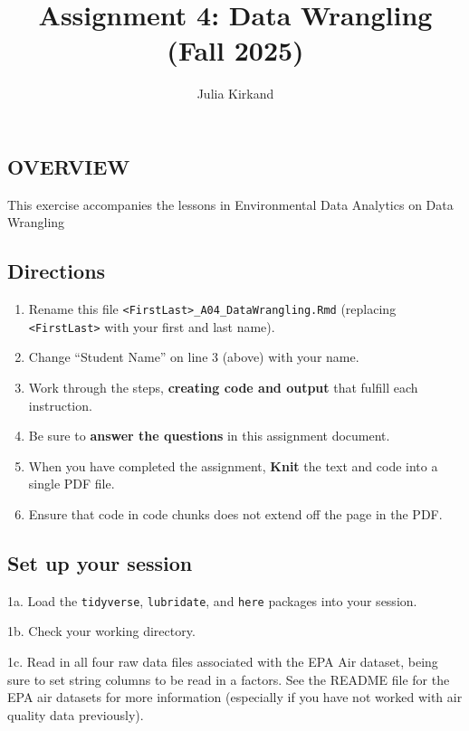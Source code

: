 \documentclass[
]{article}
\title{Assignment 4: Data Wrangling (Fall 2025)}
\author{Julia Kirkand}
\date{}
\providecommand{\tightlist}{%
  \setlength{\itemsep}{0pt}\setlength{\parskip}{0pt}}
\begin{document}
\maketitle

\subsection{OVERVIEW}\label{overview}

This exercise accompanies the lessons in Environmental Data Analytics on
Data Wrangling

\subsection{Directions}\label{directions}

\begin{enumerate}
\def\labelenumi{\arabic{enumi}.}
\tightlist
\item
  Rename this file
  \texttt{\textless{}FirstLast\textgreater{}\_A04\_DataWrangling.Rmd}
  (replacing \texttt{\textless{}FirstLast\textgreater{}} with your first
  and last name).
\item
  Change ``Student Name'' on line 3 (above) with your name.
\item
  Work through the steps, \textbf{creating code and output} that fulfill
  each instruction.
\item
  Be sure to \textbf{answer the questions} in this assignment document.
\item
  When you have completed the assignment, \textbf{Knit} the text and
  code into a single PDF file.
\item
  Ensure that code in code chunks does not extend off the page in the
  PDF.
\end{enumerate}

\subsection{Set up your session}\label{set-up-your-session}

1a. Load the \texttt{tidyverse}, \texttt{lubridate}, and \texttt{here}
packages into your session.

1b. Check your working directory.

1c. Read in all four raw data files associated with the EPA Air dataset,
being sure to set string columns to be read in a factors. See the README
file for the EPA air datasets for more information (especially if you
have not worked with air quality data previously).
\end{document}
